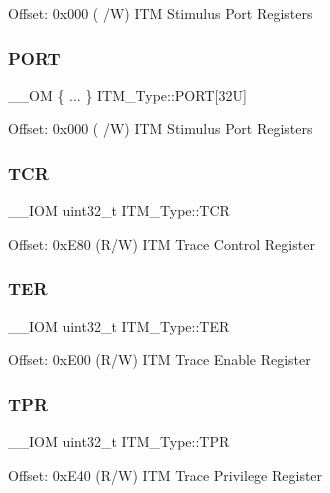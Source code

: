 Offset\+: 0x000 ( /W) I\+TM Stimulus Port Registers \mbox{\label{struct_i_t_m___type_a7010d53d9f2b725fba177015cbdc6bc2}} 
\subsubsection{\texorpdfstring{PORT}{PORT}\hspace{0.1cm}{\footnotesize\ttfamily [6/6]}}
{\footnotesize\ttfamily \+\_\+\+\_\+\+OM \{ ... \}    I\+T\+M\+\_\+\+Type\+::\+P\+O\+RT\mbox{[}32\+U\mbox{]}}

Offset\+: 0x000 ( /W) I\+TM Stimulus Port Registers \mbox{\label{struct_i_t_m___type_a04b9fbc83759cb818dfa161d39628426}} 
\subsubsection{\texorpdfstring{TCR}{TCR}}
{\footnotesize\ttfamily \+\_\+\+\_\+\+I\+OM uint32\+\_\+t I\+T\+M\+\_\+\+Type\+::\+T\+CR}

Offset\+: 0x\+E80 (R/W) I\+TM Trace Control Register \mbox{\label{struct_i_t_m___type_acd03c6858f7b678dab6a6121462e7807}} 
\subsubsection{\texorpdfstring{TER}{TER}}
{\footnotesize\ttfamily \+\_\+\+\_\+\+I\+OM uint32\+\_\+t I\+T\+M\+\_\+\+Type\+::\+T\+ER}

Offset\+: 0x\+E00 (R/W) I\+TM Trace Enable Register \mbox{\label{struct_i_t_m___type_ae907229ba50538bf370fbdfd54c099a2}} 
\subsubsection{\texorpdfstring{TPR}{TPR}}
{\footnotesize\ttfamily \+\_\+\+\_\+\+I\+OM uint32\+\_\+t I\+T\+M\+\_\+\+Type\+::\+T\+PR}

Offset\+: 0x\+E40 (R/W) I\+TM Trace Privilege Register \mbox{\label{struct_i_t_m___type_a962a970dfd286cad7f8a8577e87d4ad3}} 
